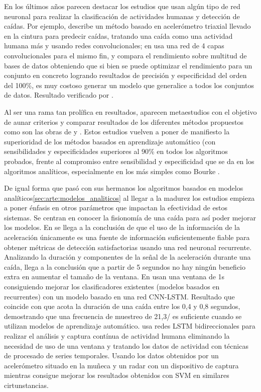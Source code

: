 En los últimos años parecen destacar los estudios que usan algún tipo de red neuronal \cite{Musci2020,Shi2020,Casilari2020,Liu2020} para realizar la clasificación de actividades humanas y detección de caídas. Por ejemplo,  describe un método basado en acelerómetro triaxial llevado en la cintura para predecir caídas, tratando una caída como una actividad humana más y usando redes convolucionales; en  usa una red de 4 capas convolucionales para el mismo fin, y compara el rendimiento sobre multitud de bases de datos obteniendo que si bien se puede optimizar el rendimiento para un conjunto en concreto logrando resultados de precisión y especificidad del orden del 100\%, es muy costoso generar un modelo que generalice a todos los conjuntos de datos. Resultado verificado por .

Al ser una rama tan prolífica en resultados, aparecen metaestudios con el objetivo de aunar criterios y comparar resultados de los diferentes métodos propuestos como son las obras de  y . Estos estudios vuelven a poner de manifiesto la superioridad de los métodos basados en aprendizaje automático (con sensibilidades y especificidades superiores al 90\% en todos los algoritmos probados, frente al compromiso entre sensibilidad y especificidad que se da en los algoritmos analíticos, especialmente en los más simples como Bourke \cite{Aziz2017}.

De igual forma que pasó con sus hermanos los algoritmos basados en modelos analíticos\ref{sec:arte:modelos_analiticos} al llegar a la madurez los estudios empieza a poner énfasis en otros parámetros que impactan la efectividad de estos sistemas. Se centran en conocer la fisionomía de una caída para así poder mejorar los modelos. En \cite[p.~6]{Musci2020} se llega a la conclusión de que el uso de la información de la aceleración únicamente es una fuente de información suficientemente fiable para obtener métricas de detección satisfactorias usando una red neuronal recurrente. Analizando la duración y componentes de la señal de la aceleración durante una caída,  llega a la conclusión que a partir de 5 segundos no hay ningún beneficio extra en aumentar el tamaño de la ventana. En \cite[p.~59]{Hassan2019} usan una ventana de 1s consiguiendo mejorar los clasificadores existentes (modelos basados en recurrentes) con un modelo basado en una red CNN-LSTM. Resultado que coincide con \cite[p.~2]{Liu2018} que acota la duración de una caída entre los 0,4 y 0,8 segundos, demostrando que una frecuencia de muestreo de 21,3\hz/ es suficiente cuando se utilizan modelos de aprendizaje automático.  usa redes LSTM bidireccionales para realizar el análisis y captura contínua de actividad humana eliminando la necesidad de uso de una ventana y tratando los datos de actividad con técnicas de procesado de series temporales. Usando los datos obtenidos por un acelerómetro situado en la muñeca y un radar con un dispositivo de captura  mientras consigue mejorar los resultados obtenidos con SVM en similares cirtunstancias\cite[p.~9]{Li2019}. 


